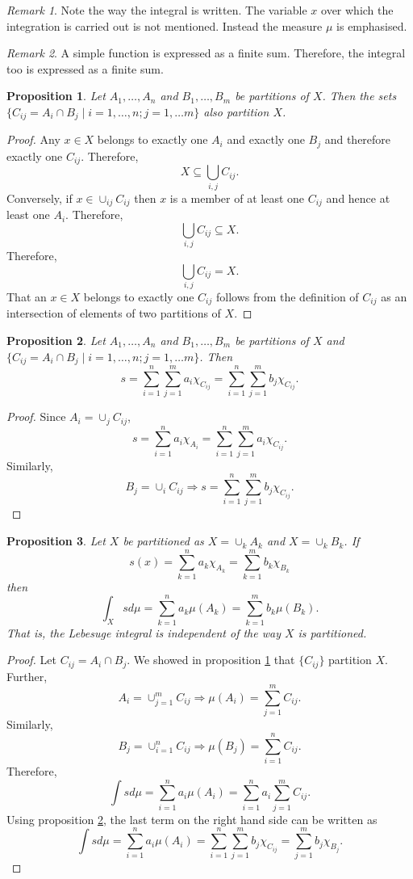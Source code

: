 \documentclass{article}
\theoremstyle{plain}
\numberwithin{thm}{section}
\theoremstyle{plain}
\newtheorem{prop}{Proposition}
\numberwithin{prop}{section}
\theoremstyle{definition}
\numberwithin{defn}{section}
\theoremstyle{remark}
\newtheorem*{rem}{Remark}
\numberwithin{equation}{section}
\begin{document}
\begin{rem}
Note the way the integral is written. The variable $x$ over which the integration
is carried out is not mentioned. Instead the measure $\mu$ is emphasised.
\end{rem}

\begin{rem}
A simple function is expressed as a finite sum. Therefore, the integral too is
expressed as a finite sum.
\end{rem}

\begin{prop}\label{s3p1}
Let $A_1, \ldots, A_n$ and $B_1, \ldots, B_m$ be partitions of $X$. Then the sets
$\{C_{ij} = A_i \cap B_j \;|\; i = 1, \ldots, n; j = 1, \ldots m\}$ also partition
$X$.
\end{prop}
\begin{proof}
Any $x \in X$ belongs to exactly one $A_i$ and exactly one $B_j$ and therefore 
exactly one $C_{ij}$. Therefore,
\[
X \subseteq \bigcup_{i, j} C_{ij}.
\]
Conversely, if $x \in \cup_{ij}C_{ij}$ then $x$ is a member of at least one $C_{ij}$
and hence at least one $A_i$. Therefore,
\[
\bigcup_{i, j} C_{ij} \subseteq X.
\]
Therefore,
\[
\bigcup_{i, j} C_{ij} = X.
\]
That an $x \in X$ belongs to exactly one $C_{ij}$ follows from the definition of
$C_{ij}$ as an intersection of elements of two partitions of $X$.
\end{proof}

\begin{prop}\label{s3p2}
Let $A_1, \ldots, A_n$ and $B_1, \ldots, B_m$ be partitions of $X$ and
$\{C_{ij} = A_i \cap B_j \;|\; i = 1, \ldots, n; j = 1, \ldots m\}$. Then
\[
s = \sum_{i=1}^n\sum_{j=1}^m a_i \chi_{C_{ij}} = 
\sum_{i=1}^n\sum_{j=1}^m b_j \chi_{C_{ij}}.
\]
\end{prop}
\begin{proof}
Since $A_i = \cup_j C_{ij}$,
\[
s = \sum_{i=1}^na_i\chi_{A_i} = \sum_{i=1}^n\sum_{j=1}^m a_i\chi_{C_{ij}}.
\]
Similarly,
\[
B_j = \cup_i C_{ij} \Rightarrow s = \sum_{i=1}^n\sum_{j=1}^m b_j\chi_{C_{ij}}.
\]
\end{proof}

\begin{prop}\label{s3p3}
Let $X$ be partitioned as $X = \cup_k A_k$ and $X = \cup_k B_k$. If
\[
s(x) = \sum_{k=1}^na_k\chi_{A_k} = \sum_{k=1}^mb_k\chi_{B_k}
\]
then
\[
\int_Xs d\mu = \sum_{k=1}^na_k\mu(A_k) = \sum_{k=1}^mb_k\mu(B_k).
\]
That is, the Lebesuge integral is independent of the way $X$ is partitioned.
\end{prop}
\begin{proof}
Let $C_{ij} = A_i \cap B_j$. We showed in proposition \ref{s3p1} that $\{C_{ij}\}$
partition $X$. Further,
\[
A_i = \cup_{j=1}^m C_{ij} \Rightarrow \mu(A_i) = \sum_{j=1}^m C_{ij}.
\]
Similarly,
\[
B_j = \cup_{i=1}^n C_{ij} \Rightarrow \mu(B_j) = \sum_{i=1}^n C_{ij}.
\]
Therefore,
\[
\int s d\mu = \sum_{i=1}^na_i\mu(A_i) = \sum_{i=1}^n a_i\sum_{j=1}^m C_{ij}.
\]
Using proposition \ref{s3p2}, the last term on the right hand side can be written
as
\[
\int s d\mu = \sum_{i=1}^na_i\mu(A_i) = \sum_{i=1}^n\sum_{j=1}^m b_j\chi_{C_{ij}}
= \sum_{j=1}^m b_j\chi_{B_j}.
\]
\end{proof}
\end{document}
